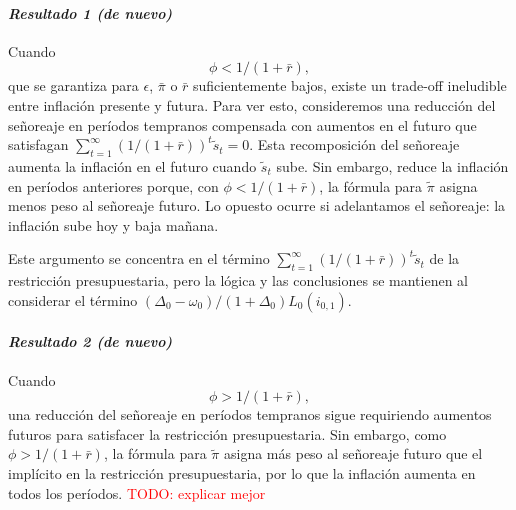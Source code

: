 \documentclass[../../entrega.tex]{subfiles}
\begin{document}
\paragraph[Resultado 1 de nuevo]{\emph{Resultado 1 (de nuevo)}}\label{par:result1again}
Cuando
\begin{equation*}
    \phi < 1/(1 + \bar{r}),
\end{equation*}
que se garantiza para $\epsilon$, $\bar{\pi}$ o $\bar{r}$ suficientemente bajos, existe un trade-off ineludible entre inflación presente y futura.
Para ver esto, consideremos una reducción del señoreaje en períodos tempranos compensada con aumentos en el futuro que satisfagan $\sum_{t=1}^{\infty}(1/(1 + \bar{r}))^t\tilde{s}_t = 0$.
Esta recomposición del señoreaje aumenta la inflación en el futuro cuando $\tilde{s}_t$ sube.
Sin embargo, reduce la inflación en períodos anteriores porque, con $\phi < 1/(1 + \bar{r})$, la fórmula para $\tilde{\pi}$ asigna menos peso al señoreaje futuro.
Lo opuesto ocurre si adelantamos el señoreaje: la inflación sube hoy y baja mañana.

Este argumento se concentra en el término $\sum_{t=1}^{\infty}(1/(1 + \bar{r}))^t\tilde{s}_t$ de la restricción presupuestaria, pero la lógica y las conclusiones se mantienen al considerar el término $(\Delta_0 - \omega_0)/(1 + \Delta_0)L_0(i_{0,1})$.

\paragraph[Resultado 2 de nuevo]{\emph{Resultado 2 (de nuevo)}}\label{par:result2again}
Cuando
\begin{equation*}
    \phi > 1/(1 + \bar{r}),
\end{equation*}
una reducción del señoreaje en períodos tempranos sigue requiriendo aumentos futuros para satisfacer la restricción presupuestaria.
Sin embargo, como $\phi > 1/(1 + \bar{r})$, la fórmula para $\tilde{\pi}$ asigna más peso al señoreaje futuro que el implícito en la restricción presupuestaria, por lo que la inflación aumenta en todos los períodos.
\textcolor{red}{TODO: explicar mejor}
\end{document}
